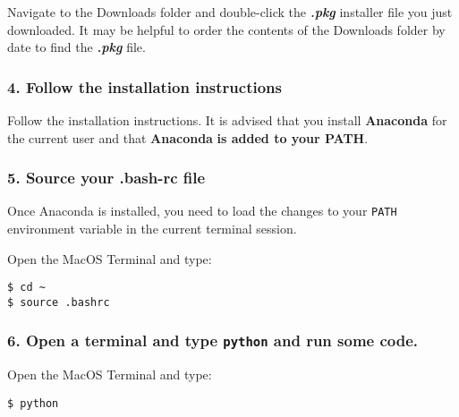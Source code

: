 \documentclass{book}
\newcommand{\passthrough}[1]{#1}
\begin{document}
Navigate to the Downloads folder and double-click the
\textbf{\emph{.pkg}} installer file you just downloaded. It may be
helpful to order the contents of the Downloads folder by date to find
the \textbf{\emph{.pkg}} file.
    




    
        \hypertarget{follow-the-installation-instructions}{%
\subsubsection{4. Follow the installation
instructions}\label{follow-the-installation-instructions}}

Follow the installation instructions. It is advised that you install
\textbf{Anaconda} for the current user and that \textbf{Anaconda}
\textbf{is added to your PATH}.
    




    
        \hypertarget{source-your-.bash-rc-file}{%
\subsubsection{5. Source your .bash-rc
file}\label{source-your-.bash-rc-file}}

Once Anaconda is installed, you need to load the changes to your
\passthrough{\lstinline!PATH!} environment variable in the current
terminal session.

Open the MacOS Terminal and type:

\begin{lstlisting}
$ cd ~
$ source .bashrc
\end{lstlisting}
    




    
        \hypertarget{open-a-terminal-and-type-python-and-run-some-code.}{%
\subsubsection{\texorpdfstring{6. Open a terminal and type
\texttt{python} and run some
code.}{6. Open a terminal and type python and run some code.}}\label{open-a-terminal-and-type-python-and-run-some-code.}}

Open the MacOS Terminal and type:

\begin{lstlisting}
$ python
\end{lstlisting}
\end{document}
